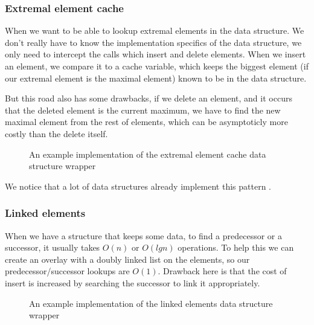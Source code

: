 \documentclass[a4paper,11pt]{article}
\begin{document}
		\subsubsection{Extremal element cache}

			When we want to be able to lookup extremal elements in the data structure. We don't really have
			to know the implementation specifics of the data structure, we only need to intercept the calls
			which insert and delete elements. When we insert an element, we compare it to a cache variable,
			which keeps the biggest element (if our extremal element is the maximal element) known to be in
			the data structure.

			But this road also has some drawbacks, if we delete an element, and it occurs that the deleted
			element is the current maximum, we have to find the new maximal element from the rest of
			elements, which can be asymptoticly more costly than the delete itself.


			\begin{figure}
				

				\caption{An example implementation of the extremal element cache data structure wrapper}

				\label{fig:elem-cache}
			\end{figure}

			We notice that a lot of data structures already implement this pattern .

		\subsubsection{Linked elements}

			When we have a structure that keeps some data, to find a predecessor or a successor, it usually
			takes $O(n)$ or $O(lg n)$ operations.  To help this we can create an overlay with a doubly
			linked list on the elements, so our predecessor/successor lookups are $O(1)$. Drawback here is
			that the cost of insert is increased by searching the successor to link it appropriately.

			\begin{figure}
				

				\caption{An example implementation of the linked elements data structure wrapper}

				\label{fig:linked-cache}
			\end{figure}
\end{document}
